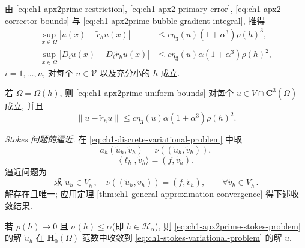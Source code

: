 \begin{Remark}
\label{rem:ch1-apx2prime-interpolation-bounds}
由 \eqref{eq:ch1-apx2prime-restriction}, \eqref{eq:ch1-apx2-primary-error}, \eqref{eq:ch1-apx2-corrector-bounds} 与 \eqref{eq:ch1-apx2prime-bubble-gradient-integral}, 推得
\begin{equation}
\begin{aligned}
\sup_{x\in\Omega}|u(x)-\widetilde r_hu(x)|
&\leq c\eta_3(u)(1+\alpha^3)\rho(h)^3,\\
\sup_{x\in\Omega}|D_iu(x)-D_i\widetilde r_hu(x)|
&\leq c\eta_3(u)\alpha(1+\alpha^3)\rho(h)^2,
\end{aligned}
\label{eq:ch1-apx2prime-uniform-bounds}
\end{equation}
$i=1,\ldots,n$, 对每个 $u\in\mathcal V$ 以及充分小的 $h$ 成立.

若 $\Omega=\Omega(h)$, 则 \eqref{eq:ch1-apx2prime-uniform-bounds} 对每个
$u\in V\cap\mathbf C^3(\overline\Omega)$ 成立, 并且
\begin{equation}
\|u-\widetilde r_hu\|
\leq c\eta_3(u)\alpha(1+\alpha^3)\rho(h)^2.
\label{eq:ch1-apx2prime-h1-interpolation-error}
\end{equation}
\end{Remark}

\emph{Stokes 问题的逼近.} 在 \eqref{eq:ch1-discrete-variational-problem} 中取
\begin{equation}
a_h(\widetilde u_h,\widetilde v_h)
=\nu((\widetilde u_h,\widetilde v_h)),
\label{eq:ch1-apx2prime-stokes-bilinear}
\end{equation}
\begin{equation}
\langle\ell_h,\widetilde v_h\rangle
=(f,\widetilde v_h).
\label{eq:ch1-apx2prime-stokes-linear}
\end{equation}
逼近问题为
\begin{equation}
\text{求 }\widetilde u_h\in V_h^+,\quad
\nu((\widetilde u_h,\widetilde v_h))
=(f,\widetilde v_h),\qquad\forall\widetilde v_h\in V_h^+.
\label{eq:ch1-apx2prime-stokes-problem}
\end{equation}
解存在且唯一; 应用定理 \ref{thm:ch1-general-approximation-convergence} 得下述收敛结果.

\begin{Proposition}
\label{prop:ch1-apx2prime-stokes-convergence}
若 $\rho(h)\to0$ 且 $\sigma(h)\leq\alpha$(即 $h\in\mathcal H_\alpha$), 则 \eqref{eq:ch1-apx2prime-stokes-problem} 的解 $\widetilde u_h$ 在 $\mathbf H_0^1(\Omega)$ 范数中收敛到 \eqref{eq:ch1-stokes-variational-problem} 的解 $u$.
\end{Proposition}

